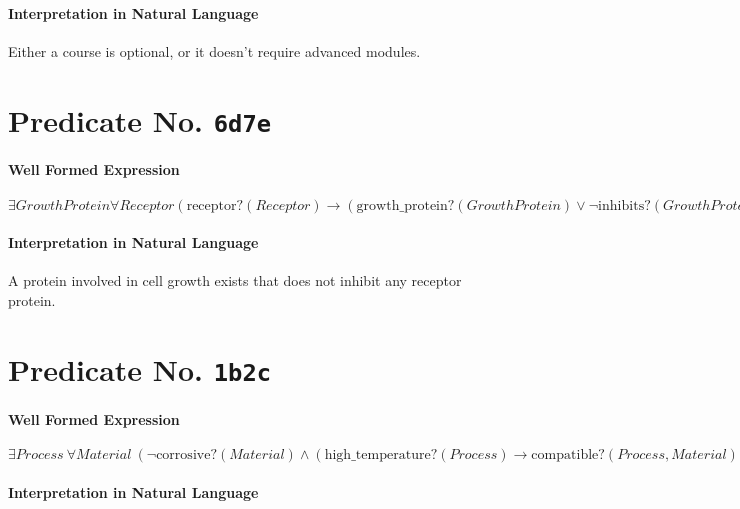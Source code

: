 \documentclass[11pt]{article}
\begin{document}
\paragraph*{Interpretation in Natural Language}
\label{sec:orgf77ce86}

Either a course is optional, or it doesn't require advanced modules.



\section{Predicate No. \texttt{6d7e}}
\label{sec:org631f489}

\paragraph*{Well Formed Expression}
\label{sec:orgf5c6525}

\(\exists \mathit{GrowthProtein} \forall \mathit{Receptor} (\mathrm{receptor?}(\mathit{Receptor}) \rightarrow (\mathrm{growth\_protein?}(\mathit{GrowthProtein}) \lor \neg \mathrm{inhibits?}(\mathit{GrowthProtein}, \mathit{Receptor})))\)

\paragraph*{Interpretation in Natural Language}
\label{sec:org86277c6}

A protein involved in cell growth exists that does not inhibit any receptor protein.



\section{Predicate No. \texttt{1b2c}}
\label{sec:org1701969}

\paragraph*{Well Formed Expression}
\label{sec:org4b27f8c}

\(\exists \mathit{Process}\ \forall \mathit{Material}\ (\neg \mathrm{corrosive?}(\mathit{Material}) \land (\mathrm{high\_temperature?}(\mathit{Process}) \rightarrow \mathrm{compatible?}(\mathit{Process}, \mathit{Material})))\)

\paragraph*{Interpretation in Natural Language}
\label{sec:orgf462edb}
\end{document}
